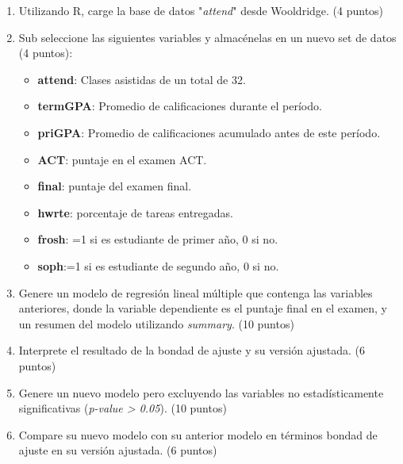 \documentclass[letterpaper,11pt]{article}
\begin{document}
\begin{enumerate}
    \item Utilizando R, carge la base de datos "\textit{attend}" desde Wooldridge. (4 puntos)



    \item Sub seleccione las siguientes variables y almacénelas en un nuevo set de datos (4 puntos):

\begin{itemize}
\item \textbf{attend}: Clases asistidas de un total de 32.
\item \textbf{termGPA}: Promedio de calificaciones durante el período.
\item \textbf{priGPA}: Promedio de calificaciones acumulado antes de este período.
\item \textbf{ACT}: puntaje en el examen ACT.
\item \textbf{final}: puntaje del examen final.
\item \textbf{hwrte}: porcentaje de tareas entregadas.
\item \textbf{frosh}: =1 si es estudiante de primer año, 0 si no.
\item \textbf{soph}:=1 si es estudiante de segundo año, 0 si no.
\end{itemize}



    \item Genere un modelo de regresión lineal múltiple que contenga las variables anteriores, donde la variable dependiente es el puntaje final en el examen, y un resumen del modelo utilizando \textit{summary}. (10 puntos)

    \item Interprete el resultado de la bondad de ajuste y su versión ajustada. (6 puntos)

    \item Genere un nuevo modelo pero excluyendo las variables no estadísticamente significativas (\textit{p-value > 0.05}). (10 puntos)



    \item Compare su nuevo modelo con su anterior modelo en términos bondad de ajuste en su versión ajustada. (6 puntos)


\end{enumerate}
\newpage
\end{document}

